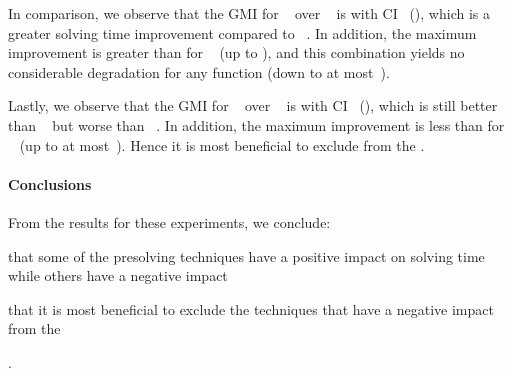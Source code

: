 In comparison, we observe that the \gls{GMI} for ~ over ~ is \printGMI{%
  \SolvTechDisableBadPresolvingPrePlusSolvingTimeSpeedupPrePlusSolvingTimeRegularSpeedupGmean%
} with \gls{CI}~\printGMICI{%
  \SolvTechDisableBadPresolvingPrePlusSolvingTimeSpeedupPrePlusSolvingTimeRegularSpeedupCiMin%
}{%
  \SolvTechDisableBadPresolvingPrePlusSolvingTimeSpeedupPrePlusSolvingTimeRegularSpeedupCiMax%
} (), which is a greater solving
time improvement compared to ~.
%
In addition, the maximum improvement is greater than for ~ (up to
\printZCNorm{%
  \SolvTechDisableBadPresolvingPrePlusSolvingTimeSpeedupPrePlusSolvingTimeZeroCenteredSpeedupMax%
}), and this combination yields no considerable degradation for any
\gls{function} (down to at
most~\printZCNorm{%
  \SolvTechDisableBadPresolvingPrePlusSolvingTimeSpeedupPrePlusSolvingTimeZeroCenteredSpeedupMin%
}).

Lastly, we observe that the \gls{GMI} for ~ over ~ is \printGMI{%
  \SolvTechDisableAllPresolvingPrePlusSolvingTimeSpeedupPrePlusSolvingTimeRegularSpeedupGmean%
} with \gls{CI}~\printGMICI{%
  \SolvTechDisableAllPresolvingPrePlusSolvingTimeSpeedupPrePlusSolvingTimeRegularSpeedupCiMin%
}{%
  \SolvTechDisableAllPresolvingPrePlusSolvingTimeSpeedupPrePlusSolvingTimeRegularSpeedupCiMax%
} (), which is still better than
~ but worse than
~.
%
In addition, the maximum improvement is less than for ~ (up to at
most~\printZCNorm{%
  \SolvTechDisableAllPresolvingPrePlusSolvingTimeSpeedupPrePlusSolvingTimeZeroCenteredSpeedupMax%
}).
%
Hence it is most beneficial to exclude
 from the
.


\paragraph{Conclusions}

From the results for these experiments, we conclude:
%
\begin{enumerate*}[label=(\roman*), itemjoin={;\ }, itemjoin*={; and\ }]
  \item that some of the \gls{presolving} techniques have a positive impact on
    solving time while others have a negative impact
  \item that it is most beneficial to exclude the techniques that have a
    negative impact from the 
\end{enumerate*}.


